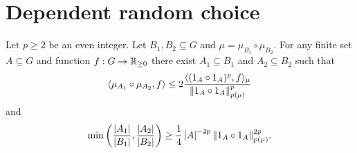 \chapter{Dependent random choice}


\begin{lemma}
\label{lem-drc}
\leanok
Let $p\geq 2$ be an even integer. Let $B_1,B_2\subseteq G$ and $\mu=\mu_{B_1}\circ\mu_{B_2}$. For any finite set $A\subseteq G$ and function $f:G\to\mathbb{R}_{\geq 0}$ there exist $A_1\subseteq B_1$ and $A_2\subseteq B_2$ such that
\[\langle \mu_{A_1}\circ \mu_{A_2}, f\rangle\leq 2\frac{\langle (1_{A}\circ 1_{A})^p,f\rangle_\mu}{\lVert 1_{A}\circ 1_{A}\rVert_{p(\mu)}^p}\]
and
\[\min\left( \frac{\left\lvert A_1\right\rvert}{\left\lvert B_1\right\rvert},\frac{\left\lvert A_2\right\rvert}{\left\lvert B_2\right\rvert}\right)\geq \frac{1}{4}\left\lvert A\right\rvert^{-2p}\lVert 1_{A}\circ 1_{A}\rVert_{p(\mu)}^{2p}.\]
\end{lemma}

